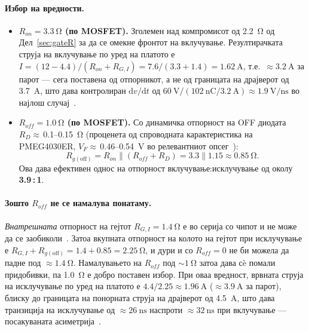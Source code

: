 \documentclass[journal,onecolumn,11pt]{IEEEtran}
\begin{document}
\paragraph{Избор на вредности.}
\begin{itemize}[leftmargin=1.4em]
  \item \textbf{$R_{on}=\SI{3.3}{\ohm}$ (по MOSFET).} Зголемен над компромисот од
        \SI{2.2}{\ohm} од Дел~\ref{sec:gateR} за да се омекне фронтот на вклучување.
        Резултирачката струја на вклучување по уред на платото е
        $I=(12-4.4)/(R_{on}+R_{G,I})=7.6/(3.3+1.4)=\SI{1.62}{\ampere}$, т.е.\
        $\approx\SI{3.2}{\ampere}$ за парот --- сега поставена од отпорникот, а не од
        границата на драјверот од \SI{3.7}{\ampere}, што дава контролиран
        $\mathrm{d}v/\mathrm{d}t$ од
        $\SI{60}{\volt}/(\SI{102}{\nano\coulomb}/\SI{3.2}{\ampere})\approx\SI{1.9}{\volt\per\nano\second}$
        во најлош случај~\cite{ipt015ds,ucc27211}.
  \item \textbf{$R_{off}=\SI{1.0}{\ohm}$ (по MOSFET).} Со динамичка отпорност на OFF
        диодата $R_{D}\approx$\,0.1--\SI{0.15}{\ohm} (проценета од спроводната
        карактеристика на PMEG4030ER, $V_F\approx$\,0.46--\SI{0.54}{\volt} во
        релевантниот опсег~\cite{pmeg4030er}):
        \begin{equation}
        R_{g(\text{off})}=R_{on}\parallel(R_{off}+R_D)=3.3\parallel 1.15\approx\SI{0.85}{\ohm}.
        \end{equation}
        Ова дава ефективен однос на отпорност вклучување:исклучување од околу
        \textbf{3.9\,:\,1}.
\end{itemize}

\paragraph{Зошто $R_{off}$ не се намалува понатаму.} \emph{Внатрешната} отпорност на
гејтот $R_{G,I}=\SI{1.4}{\ohm}$ е во серија со чипот и не може да се
заобиколи~\cite{ipt015ds}. Затоа вкупната отпорност на колото на гејтот при
исклучување е $R_{G,I}+R_{g(\text{off})}=1.4+0.85=\SI{2.25}{\ohm}$, и дури и со
$R_{off}=0$ не би можела да падне под $\approx\SI{1.4}{\ohm}$. Намалувањето на
$R_{off}$ под $\sim\SI{1}{\ohm}$ затоа дава сè помали придобивки, па \SI{1.0}{\ohm} е
добро поставен избор. При оваа вредност, врвната струја на исклучување по уред на
платото е $4.4/2.25\approx\SI{1.96}{\ampere}$ ($\approx\SI{3.9}{\ampere}$ за парот),
блиску до границата на понорната струја на драјверот од \SI{4.5}{\ampere}, што дава
транзиција на исклучување од $\approx\SI{26}{\nano\second}$ наспроти
$\approx\SI{32}{\nano\second}$ при вклучување --- посакуваната асиметрија~\cite{ucc27211}.
\end{document}
